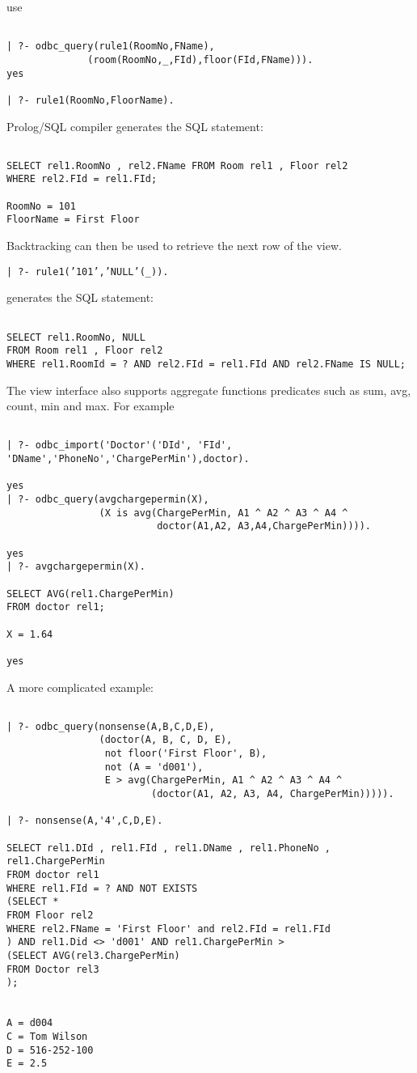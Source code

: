 use

\begin{verbatim}
	
| ?- odbc_query(rule1(RoomNo,FName),
	          (room(RoomNo,_,FId),floor(FId,FName))).
yes

| ?- rule1(RoomNo,FloorName).
\end{verbatim}

Prolog/SQL compiler generates the SQL statement:
\begin{verbatim}

SELECT rel1.RoomNo , rel2.FName FROM Room rel1 , Floor rel2 
WHERE rel2.FId = rel1.FId;

RoomNo = 101
FloorName = First Floor
\end{verbatim}

Backtracking can then be used to retrieve the next row of the view.
\begin{center}

{\tt | ?- rule1('101','NULL'(\_)).}
\end{center}

generates the SQL statement:
\begin{verbatim}

SELECT rel1.RoomNo, NULL
FROM Room rel1 , Floor rel2
WHERE rel1.RoomId = ? AND rel2.FId = rel1.FId AND rel2.FName IS NULL;
\end{verbatim}

The view interface also supports aggregate functions predicates such as sum, avg,
count, min and max.  For example
\begin{verbatim}

| ?- odbc_import('Doctor'('DId', 'FId', 'DName','PhoneNo','ChargePerMin'),doctor).

yes
| ?- odbc_query(avgchargepermin(X),
                (X is avg(ChargePerMin, A1 ^ A2 ^ A3 ^ A4 ^ 
                          doctor(A1,A2, A3,A4,ChargePerMin)))).

yes
| ?- avgchargepermin(X).

SELECT AVG(rel1.ChargePerMin)
FROM doctor rel1;

X = 1.64

yes
\end{verbatim}


A more complicated example:
\begin{verbatim}

| ?- odbc_query(nonsense(A,B,C,D,E),
                (doctor(A, B, C, D, E), 
                 not floor('First Floor', B), 
                 not (A = 'd001'), 
                 E > avg(ChargePerMin, A1 ^ A2 ^ A3 ^ A4 ^
                         (doctor(A1, A2, A3, A4, ChargePerMin))))).

| ?- nonsense(A,'4',C,D,E).

SELECT rel1.DId , rel1.FId , rel1.DName , rel1.PhoneNo , rel1.ChargePerMin
FROM doctor rel1
WHERE rel1.FId = ? AND NOT EXISTS
(SELECT *
FROM Floor rel2
WHERE rel2.FName = 'First Floor' and rel2.FId = rel1.FId
) AND rel1.Did <> 'd001' AND rel1.ChargePerMin >
(SELECT AVG(rel3.ChargePerMin)
FROM Doctor rel3
);


A = d004
C = Tom Wilson
D = 516-252-100
E = 2.5
\end{verbatim}

